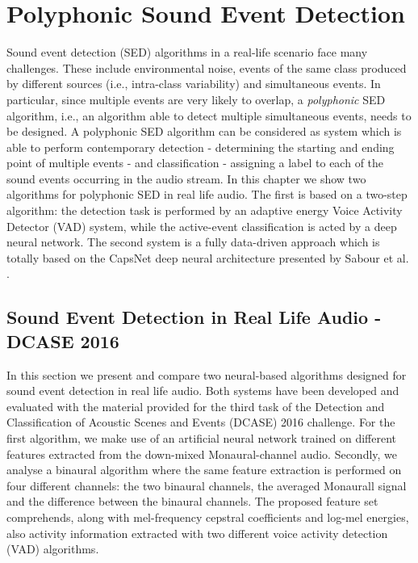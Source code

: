 \chapter{Polyphonic Sound Event Detection}
Sound event detection (SED) algorithms in a real-life scenario face many challenges. These include  environmental noise, events of the same class produced by different sources (i.e., intra-class variability) and simultaneous events. In particular, since multiple events are very likely to overlap, a \textit{polyphonic} SED algorithm, i.e., an algorithm able to detect multiple simultaneous events, needs to be designed. A polyphonic SED algorithm can be considered as system which is able to perform contemporary detection - determining the starting and ending point of multiple events - and classification - assigning a label to each of the sound events occurring in the audio stream. In this chapter we show two algorithms for polyphonic SED in real life audio. The first is based on a two-step algorithm: the detection task is performed by an adaptive energy Voice Activity Detector (VAD) system, while the active-event classification is acted by a deep neural network. The second system is a fully data-driven approach which is totally based on the CapsNet deep neural architecture presented by Sabour et al. \cite{sabour2017dynamic}. 
\vspace{-0.5cm}
\section{Sound Event Detection in Real Life Audio - DCASE 2016}
\label{sec:sed_dcase2016}
In this section we present and compare two neural-based algorithms designed for sound event detection in real life audio. Both systems have been developed and evaluated with the material provided for the third task of the Detection and Classification of Acoustic Scenes and Events (DCASE) 2016 challenge. For the first algorithm, we make use of an artificial neural network trained on different features extracted from the down-mixed Monaural-channel audio. Secondly, we analyse a binaural algorithm where the same feature extraction is performed on four different channels: the two binaural channels, the averaged Monaurall signal and the difference between the binaural channels. The proposed feature set comprehends, along with mel-frequency cepstral coefficients and log-mel energies, also activity information extracted with two different voice activity detection (VAD) algorithms.

